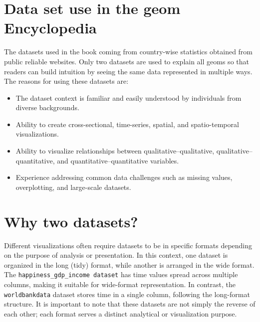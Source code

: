 \documentclass[
  letterpaper,
  DIV=11,
  numbers=noendperiod]{scrreprt}
\begin{document}
\section*{Data set use in the geom
Encyclopedia}\label{data-set-use-in-the-geom-encyclopedia}


The datasets used in the book coming from country-wise statistics
obtained from public reliable websites. Only two datasets are used to
explain all geoms so that readers can build intuition by seeing the same
data represented in multiple ways. The reasons for using these datasets
are:

\begin{itemize}
\item
  The dataset context is familiar and easily understood by individuals
  from diverse backgrounds.
\item
  Ability to create cross-sectional, time-series, spatial, and
  spatio-temporal visualizations.
\item
  Ability to visualize relationships between qualitative--qualitative,
  qualitative--quantitative, and quantitative--quantitative variables.
\item
  Experience addressing common data challenges such as missing values,
  overplotting, and large-scale datasets.
\end{itemize}

\section*{Why two datasets?}\label{why-two-datasets}


Different visualizations often require datasets to be in specific
formats depending on the purpose of analysis or presentation. In this
context, one dataset is organized in the long (tidy) format, while
another is arranged in the wide format. The
\texttt{happiness\_gdp\_income\ dataset} has time values spread across
multiple columns, making it suitable for wide-format representation. In
contrast, the \texttt{worldbankdata} dataset stores time in a single
column, following the long-format structure. It is important to note
that these datasets are not simply the reverse of each other; each
format serves a distinct analytical or visualization purpose.
\end{document}
